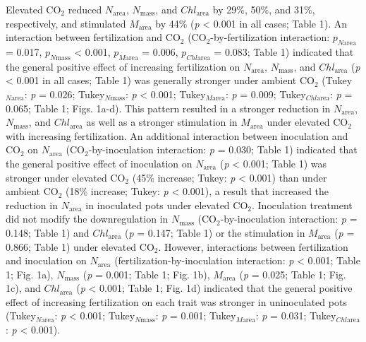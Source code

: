 Elevated CO$_2$ reduced $N_\mathrm{area}$, $N_\mathrm{mass}$, and $Chl_\mathrm{area}$ by 29\%, 50\%, and 31\%, respectively, and stimulated $M_\mathrm{area}$ by 44\% (\textit{p} < 0.001 in all cases; Table 1). An interaction between fertilization and CO$_2$ (CO$_2$-by-fertilization interaction: $p_{N\mathrm{area}}$ = 0.017, $p_{N\mathrm{mass}}$ < 0.001, $p_{M\mathrm{area}}$ = 0.006, $p_{Chl\mathrm{area}}$ = 0.083; Table 1) indicated that the general positive effect of increasing fertilization on $N_\mathrm{area}$, $N_\mathrm{mass}$, and $Chl_\mathrm{area}$ (\textit{p} < 0.001 in all cases; Table 1) was generally stronger under ambient CO$_2$ (Tukey$_{N\mathrm{area}}$: \textit{p} = 0.026; Tukey$_{N\mathrm{mass}}$: \textit{p} < 0.001; Tukey$_{M\mathrm{area}}$: \textit{p} = 0.009; Tukey$_{Chl\mathrm{area}}$: \textit{p} = 0.065; Table 1; Figs. 1a-d). This pattern resulted in a stronger reduction in $N_\mathrm{area}$, $N_\mathrm{mass}$, and $Chl_\mathrm{area}$  as well as a stronger stimulation in $M_\mathrm{area}$ under elevated CO$_2$ with increasing fertilization. An additional interaction between inoculation and CO$_2$ on $N_\mathrm{area}$ (CO$_2$-by-inoculation interaction: \textit{p} = 0.030; Table 1) indicated that the general positive effect of inoculation on $N_\mathrm{area}$ (\textit{p} < 0.001; Table 1) was stronger under elevated CO$_2$ (45\% increase; Tukey: \textit{p} < 0.001) than under ambient CO$_2$ (18\% increase; Tukey: \textit{p} < 0.001), a result that increased the reduction in $N_\mathrm{area}$ in inoculated pots under elevated CO$_2$. Inoculation treatment did not modify the downregulation in $N_\mathrm{mass}$ (CO$_2$-by-inoculation interaction: \textit{p} = 0.148; Table 1) and $Chl_\mathrm{area}$ (\textit{p} = 0.147; Table 1) or the stimulation in $M_\mathrm{area}$ (\textit{p} = 0.866; Table 1) under elevated CO$_2$. However, interactions between fertilization and inoculation on $N_\mathrm{area}$ (fertilization-by-inoculation interaction: \textit{p} < 0.001; Table 1; Fig. 1a), $N_\mathrm{mass}$ (\textit{p} = 0.001; Table 1; Fig. 1b), $M_\mathrm{area}$ (\textit{p} = 0.025; Table 1; Fig. 1c), and $Chl_\mathrm{area}$ (\textit{p} < 0.001; Table 1; Fig. 1d) indicated that the general positive effect of increasing fertilization on each trait was stronger in uninoculated pots (Tukey$_{N\mathrm{area}}$: \textit{p} < 0.001; Tukey$_{N\mathrm{mass}}$: \textit{p} = 0.001; Tukey$_{M\mathrm{area}}$: \textit{p} = 0.031; Tukey$_{Chl\mathrm{area}}$: \textit{p} < 0.001).


